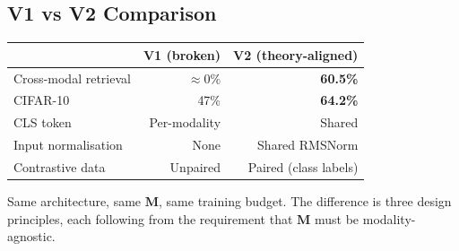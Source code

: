 \documentclass[11pt, a4paper]{article}
\newcommand{\M}{\mathbf{M}}
\theoremstyle{plain}
\theoremstyle{remark}
\begin{document}
\subsection{V1 vs V2 Comparison}

\begin{center}\small
\begin{tabular}{@{}lrr@{}}
\toprule
& V1 (broken) & V2 (theory-aligned) \\
\midrule
Cross-modal retrieval & $\approx 0\%$ & \textbf{60.5\%} \\
CIFAR-10 & 47\% & \textbf{64.2\%} \\
CLS token & Per-modality & Shared \\
Input normalisation & None & Shared RMSNorm \\
Contrastive data & Unpaired & Paired (class labels) \\
\bottomrule
\end{tabular}
\end{center}

Same architecture, same $\M$, same training budget.
The difference is three design principles, each following from the requirement that $\M$ must be modality-agnostic.
\end{document}
